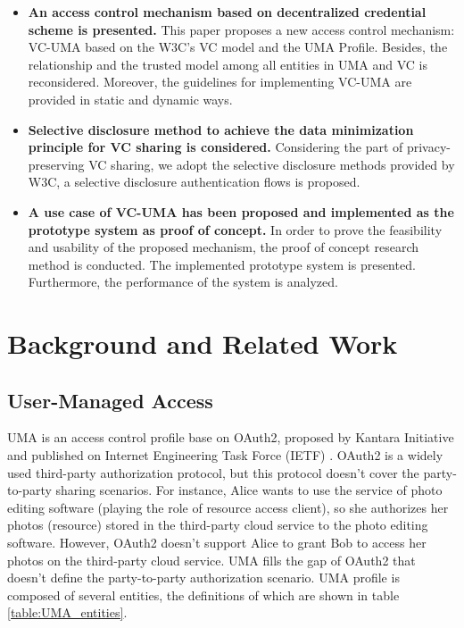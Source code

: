 \documentclass[conference]{IEEEtran}
\begin{document}
\begin{sloppypar}
\begin{itemize}
  \item \textbf{An access control mechanism based on decentralized credential scheme is presented.}	This paper proposes a new access control mechanism: VC-UMA based on the W3C's VC model\cite{VC_model} and the UMA Profile\cite{UMA}. Besides, the relationship and the trusted model among all entities in UMA and VC is reconsidered. Moreover, the guidelines for implementing VC-UMA are provided in static and dynamic ways.
  \item \textbf{Selective disclosure method to achieve the data minimization principle for VC sharing is considered.} Considering the part of privacy-preserving VC sharing, we adopt the selective disclosure methods provided by W3C, a selective disclosure authentication flows is proposed.
  \item \textbf{A use case of VC-UMA has been proposed and implemented as the prototype system as proof of concept.}
  In order to prove the feasibility and usability of the proposed mechanism, the proof of concept research method is conducted. The implemented prototype system is presented. Furthermore, the performance of the system is analyzed.
\end{itemize}


\section{Background and Related Work}
\label{sec:back}
\subsection{User-Managed Access}


UMA is an access control profile base on OAuth2\cite{OAuth2}, proposed by Kantara Initiative and published on Internet Engineering Task Force (IETF) \cite{UMA}. 
OAuth2 is a  widely used third-party authorization protocol, but this protocol doesn't cover the party-to-party sharing scenarios.
For instance, Alice wants to use the service of photo editing software (playing the role of resource access client), so she authorizes her photos (resource) stored in the third-party cloud service to the photo editing software. However, OAuth2 doesn't support Alice to grant Bob to access her photos on the third-party cloud service.
UMA fills the gap of OAuth2 that doesn't define the party-to-party authorization scenario. 
UMA profile is composed of several entities, the definitions of which are shown in table \ref{table:UMA_entities}.


\end{sloppypar}
\end{document}
